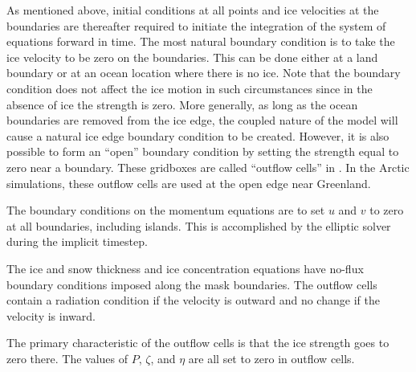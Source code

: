 As mentioned above, initial conditions at all points and ice
velocities at the boundaries are thereafter required to initiate the
integration of the system of equations forward in time.  The most
natural boundary condition is to take the ice velocity to be zero on
the boundaries.  This can be done either at a land boundary or at an
ocean location where there is no ice.  Note that the boundary
condition does not affect the ice motion in such circumstances since
in the absence of ice the strength is zero.  More generally, as long
as the ocean boundaries are removed from the ice edge, the coupled
nature of the model will cause a natural ice edge boundary condition
to be created.  However, it is also possible to form an ``open''
boundary condition by setting the strength equal to zero near a
boundary.  These gridboxes are called ``outflow cells'' in
\cite{Hibler79}.  In the Arctic simulations, these outflow cells
are used at the open edge near Greenland.

The boundary conditions on the momentum equations are to set $u$ and $v$
to zero at all boundaries, including islands.  This is accomplished
by the elliptic solver during the implicit timestep.

The ice and snow thickness and ice concentration equations have no-flux
boundary conditions imposed along the mask boundaries.  The outflow
cells contain a radiation condition if the velocity is outward and no
change if the velocity is inward.

The primary characteristic of the outflow cells is that the ice
strength goes to zero there.  The values of $P$, $\zeta$, and $\eta$
are all set to zero in outflow cells.
